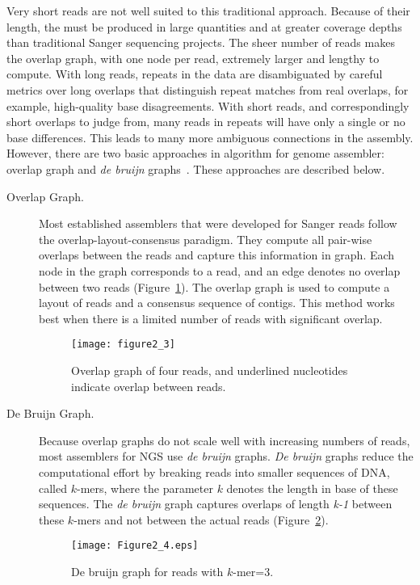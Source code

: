 Very short reads are not well suited to this traditional approach. Because of their length, the must be produced in large quantities and at greater coverage depths than traditional Sanger sequencing projects. The sheer number of reads makes the overlap graph, with one node per read, extremely larger and lengthy to compute. With long reads, repeats in the data are disambiguated by careful metrics over long overlaps that distinguish repeat matches from real overlaps, for example, high-quality base disagreements. With short reads, and correspondingly short overlaps to judge from, many reads in repeats will have only a single or no base differences. This leads to many more ambiguous connections in the assembly. However, there are two basic approaches in algorithm for genome assembler: overlap graph and {\em de bruijn} graphs~\cite{Li2012}. These approaches are described below.

\begin{description}

  \item [Overlap Graph.]
  Most established assemblers that were developed for Sanger reads follow the overlap-layout-consensus paradigm. They compute all pair-wise overlaps between the reads and capture this information in graph. Each node in the graph corresponds to a read, and an edge denotes no overlap between two reads (Figure~\ref{fig:Figure2.3}). The overlap graph is used to compute a layout of reads and a consensus sequence of contigs. This method works best when there is a limited number of reads with significant overlap.
  \begin{figure}[ht]
    \centering
    \texttt{[image: figure2\_3]}
    \caption[Overlap Graph]{
         Overlap graph of four reads, and underlined nucleotides indicate overlap between reads.
        }
    \label{fig:Figure2.3}
  \end{figure}
  \item [De Bruijn Graph.]
  Because overlap graphs do not scale well with increasing numbers of reads, most assemblers for NGS use {\em de bruijn} graphs. {\em De bruijn} graphs reduce the computational effort by breaking reads into smaller sequences of DNA, called $k$-mers, where the parameter $k$ denotes the length in base of these sequences. The {\em de bruijn} graph captures overlaps of length {\em k-1} between these $k$-mers and not between the actual reads (Figure~\ref{fig:Figure2.4}).
    \begin{figure}[ht]
    \centering
    \texttt{[image: Figure2\_4.eps]}
    \caption[De Bruijn Graph]{
         De bruijn graph for reads with $k$-mer=3.
        }
    \label{fig:Figure2.4}
  \end{figure}
\end{description}
